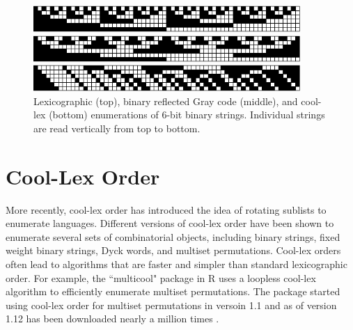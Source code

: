\begin{figure}
    \centering
\includegraphics[width=4in]{BLX6-cropped.pdf} 

\includegraphics[width=4in]{BRGC6-cropped.pdf} 

\includegraphics[width=4in]{BCLX6-cropped.pdf} 

    \caption{Lexicographic (top), binary reflected Gray code (middle), and cool-lex (bottom) enumerations of 6-bit binary strings. Individual strings are read vertically from top to bottom.}
    \label{binary}
\end{figure}

\section{Cool-Lex Order}
More recently, cool-lex order has introduced the idea of rotating sublists to enumerate languages.  Different versions of cool-lex order have been shown to enumerate several sets of combinatorial objects, including binary strings, fixed weight binary strings, Dyck words, and multiset permutations.  Cool-lex orders often lead to algorithms that are faster and simpler than standard lexicographic order.  For example, the ``multicool" package in R uses a loopless cool-lex algorithm to efficiently enumerate multiset permutations.   The package started using cool-lex order for multiset permutations in versoin 1.1 and as of version 1.12 has been downloaded nearly a million times \cite{multicool_2021}.


